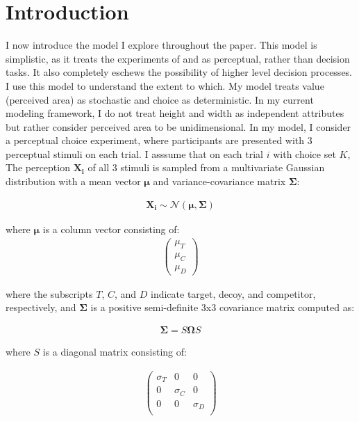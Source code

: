 \section{Introduction}

I now introduce the model I explore throughout the paper.  This model is simplistic, as it treats the experiments of \textcite{trueblood2013not} and \textcite{spektorWhenGoodLooks2018b} as perceptual, rather than decision tasks. It also completely eschews the possibility of higher level decision processes. I use this model to understand the extent to which. My model treats value (perceived area) as stochastic and choice as deterministic. In my current modeling framework, I do not treat height and width as independent attributes but rather consider perceived area to be unidimensional. In my model, I consider a perceptual choice experiment, where participants are presented with 3 perceptual stimuli on each trial. I asssume that on each trial $i$ with choice set $K$, The perception $\mathbf{X_i}$ of all 3 stimuli is sampled from a multivariate Gaussian distribution with a mean vector $\mathbf{\mu}$ and variance-covariance matrix $\mathbf{\Sigma}$:

\begin{align}
   \mathbf{X_{i}}\sim\mathcal{N}(\mathbf{\mu},\mathbf{\Sigma})
   \label{eqn:mvnorm}
\end{align}

where $\mathbf{\mu}$ is a column vector consisting of:
\begin{align}
   \begin{pmatrix}
      \mu_{T} \\
      \mu_{C} \\
      \mu_{D}
      \end{pmatrix}
   \label{eqn:mu}
\end{align}

where the subscripts $T$, $C$, and $D$ indicate target, decoy, and competitor, respectively, and $\mathbf{\Sigma}$ is a positive semi-definite 3x3 covariance matrix computed as:

\begin{align}
   \mathbf{\Sigma}=S\mathbf{\Omega}S
   \label{eqn:Sigma}
\end{align}

where $S$ is a diagonal matrix consisting of: 

\begin{align}
   \begin{pmatrix}
      \sigma_{T} & 0 & 0 \\
      0 & \sigma_{C} & 0 \\
      0 & 0 & \sigma_{D} \\
   \end{pmatrix}
   \label{eqn:S}
\end{align}


